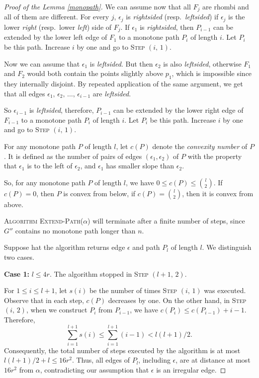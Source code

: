 \documentclass[10pt,a4paper]{amsart}
\begin{document}
\begin{proof}[Proof of the Lemma \ref{monopath}]
\smallskip
We can assume now that all $F_j$ are rhombi and all of them are different. 
For every $j$, $\epsilon_j$ 
is \emph{rightsided} (resp.\ \emph{leftsided})
if $\epsilon_j$ is the lower \emph{right} (resp.\ lower \emph{left}) side of $F_j$. 
If $\epsilon_1$ is \emph{rightsided}, 
then $P_{i-1}$ can be extended by the lower left edge of $F_1$ to a monotone path $P_i$ 
of length $i$. Let  
$P_{i}$ be this path. Increase $i$ by one and go to \textsc{Step $(i, \, 1)$}.

Now we can assume that $\epsilon_1$ is \emph{leftsided}. 
But then $\epsilon_2$ is also \emph{leftsided}, otherwise 
$F_1$ and $F_2$ would both contain the points slightly above $p_1$, which is impossible since they
internally disjoint. By repeated application of the same argument, we get that all edges 
$\epsilon_1, \, \epsilon_2, \, \ldots, \, \epsilon_{i-1}$ are \emph{leftsided}.

So $\epsilon_{i-1}$ is 
\emph{leftsided},
therefore, $P_{i-1}$ can be extended by the lower right  
edge of $F_{i-1}$ to a monotone path $P_i$ 
of length $i$. Let  
$P_{i}$ be this path. 
Increase $i$  by one and go to \textsc{Step $(i, \, 1)$}.


\bigskip


\begin{definition}
For any monotone path $P$ of 
length $l$, let $c(P)$ denote the \emph{convexity number} of $P$.
It is defined as the number of pairs of edges 
$(\epsilon_1, \epsilon_2)$ of $P$ with the property that 
$\epsilon_1$ is to the left of $\epsilon_2$, and $\epsilon_1$ has smaller slope than $\epsilon_2$.
\end{definition} 

\smallskip

So, for any monotone path $P$ of length $l$, we have
$0\le c(P)\le \binom{l}{2}$. If 
$c(P)=0$, then $P$ is convex from below, if 
$c(P)=\binom{l}{2}$, then 
it is convex from above.

\textsc{Algorithm Extend-Path($\alpha$)}
will terminate after a finite number of steps, since $G''$ contains no monotone path longer than $n$.

Suppose hat the algorithm returns edge $\epsilon$ and path $P_l$ of length $l$.
We distinguish two cases. 

\smallskip

\noindent \textbf{Case 1:} $l\le 4r$.
The algorithm stopped in \textsc{Step $(l+1, \, 2)$}.  

For 
$1\le i\le l+1$, let $s(i)$ be the number of 
times 
\textsc{Step $(i,  \, 1)$} 
was executed. 
Observe that in each step, $c(P)$ decreases by one.
On the other hand, in \textsc{Step $(i,  \, 2)$}, when we construct 
$P_i$ from $P_{i-1}$, we have $c(P_i)\le c(P_{i-1})+i-1.$
Therefore, $$\sum_{i=1}^{l+1}s(i)\le \sum_{i=1}^{l+1}(i-1)<l(l+1)/2.$$ 
Consequently, the total number of steps executed by the algorithm is at most $l(l+1)/2+l\le 16r^2$. 
Thus, 
all edges of $P_{l}$, including $\epsilon$, are  
at distance at most $16r^2$ from $\alpha$, contradicting our assumption that $\epsilon$ is an irregular edge. 


\end{proof}
\end{document}
